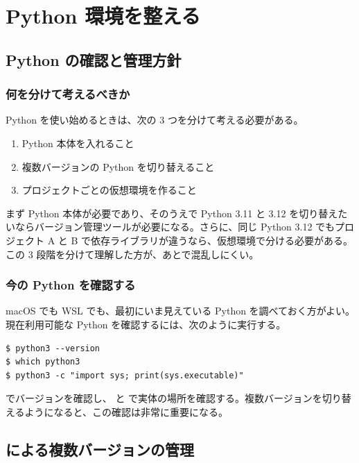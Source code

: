 \chapter{Python 環境を整える}

\section{Python の確認と管理方針}

\subsection{何を分けて考えるべきか}

Python を使い始めるときは、次の 3 つを分けて考える必要がある。

\begin{enumerate}
\item Python 本体を入れること
\item 複数バージョンの Python を切り替えること
\item プロジェクトごとの仮想環境を作ること
\end{enumerate}

まず Python 本体が必要であり、そのうえで Python 3.11 と 3.12 を切り替えたいならバージョン管理ツールが必要になる。さらに、同じ Python 3.12 でもプロジェクト A と B で依存ライブラリが違うなら、仮想環境で分ける必要がある。この 3 段階を分けて理解した方が、あとで混乱しにくい。

\subsection{今の Python を確認する}

macOS でも WSL でも、最初にいま見えている Python を調べておく方がよい。現在利用可能な Python を確認するには、次のように実行する。

\begin{lstlisting}[numbers=none, xleftmargin=2\zw]
$ python3 --version
$ which python3
$ python3 -c "import sys; print(sys.executable)"
\end{lstlisting}

 でバージョンを確認し、 と  で実体の場所を確認する。複数バージョンを切り替えるようになると、この確認は非常に重要になる。

\section{ による複数バージョンの管理}

